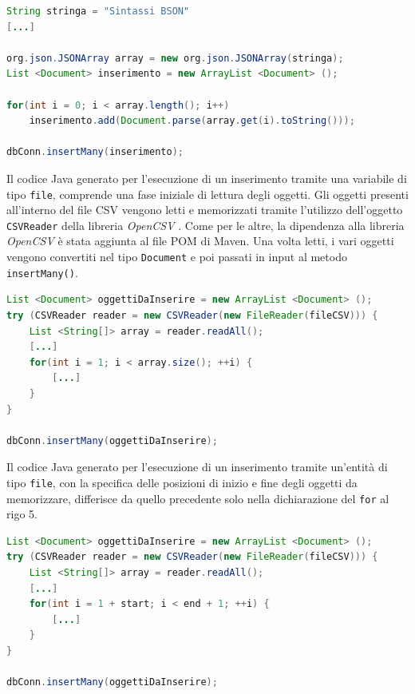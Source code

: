 \begin{lstlisting}[language=Java,caption={Codice Java generato per la variabile di tipo query per l'esecuzione di un'interrogazione di inserimento che utilizza una variabile di tipo stringa.}, label={lst:java:3}]
String stringa = "Sintassi BSON"
[...]

org.json.JSONArray array = new org.json.JSONArray(stringa);
List <Document> inserimento = new ArrayList <Document> ();

for(int i = 0; i < array.length(); i++)
	inserimento.add(Document.parse(array.get(i).toString()));

dbConn.insertMany(inserimento);
\end{lstlisting}
Il codice Java generato per l'esecuzione di un inserimento tramite una variabile di tipo \verb|file|, comprende una fase iniziale di lettura degli oggetti. Gli oggetti presenti all'interno del file CSV vengono letti e memorizzati tramite l'utilizzo dell'oggetto \verb|CSVReader| della libreria \textit{OpenCSV} \cite{opencsv}. Come per le altre, la dipendenza alla libreria \textit{OpenCSV} è stata aggiunta al file POM di Maven. Una volta letti, i vari oggetti vengono convertiti nel tipo \verb|Document| e poi passati in input al metodo \verb|insertMany()|.
\begin{lstlisting}[language=Java,caption={Codice Java generato per la variabile di tipo query, priva dei parametri start ed end, per l'esecuzione di un'interrogazione di inserimento che utilizza una variabile di tipo file.}, label={lst:java:4}]
List <Document> oggettiDaInserire = new ArrayList <Document> ();
try (CSVReader reader = new CSVReader(new FileReader(fileCSV))) {
	List <String[]> array = reader.readAll();
	[...]
	for(int i = 1; i < array.size(); ++i) {
		[...]
	}
}

dbConn.insertMany(oggettiDaInserire);
\end{lstlisting}
Il codice Java generato per l'esecuzione di un inserimento tramite un'entità di tipo \verb|file|, con la specifica delle posizioni di inizio e fine degli oggetti da memorizzare, differisce da quello precedente solo nella dichiarazione del \verb|for| al rigo 5.
\begin{lstlisting}[language=Java,caption={Codice Java generato per la variabile di tipo query per l'esecuzione di un'interrogazione di inserimento che utilizza una variabile di tipo file.}, label={lst:java:5}]
List <Document> oggettiDaInserire = new ArrayList <Document> ();
try (CSVReader reader = new CSVReader(new FileReader(fileCSV))) {
	List <String[]> array = reader.readAll();
	[...]
	for(int i = 1 + start; i < end + 1; ++i) {
		[...]
	}
}

dbConn.insertMany(oggettiDaInserire);
\end{lstlisting}
